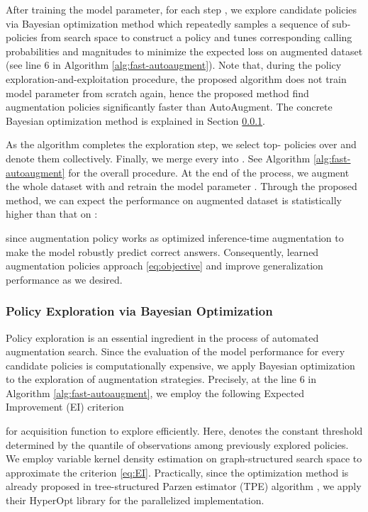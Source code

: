 \documentclass{article}
\newcommand{\cmtt}[1]{{\fontfamily{cmtt}\selectfont #1}}
\begin{document}
After training the model parameter, for each step , we explore  candidate policies  via Bayesian optimization method which repeatedly samples a sequence of sub-policies from search space  to construct a policy  and tunes corresponding calling probabilities  and magnitudes  to minimize the expected loss  on augmented dataset  (see line 6 in Algorithm \ref{alg:fast-autoaugment}). Note that, during the policy exploration-and-exploitation procedure, the proposed algorithm does not train model parameter from scratch again, hence the proposed method find augmentation policies significantly faster than AutoAugment. The concrete Bayesian optimization method is explained in Section \ref{subsubsec:optimization-density-estimation}. 


As the algorithm completes the exploration step, we select top- policies over  and denote them  collectively. Finally, we merge every  into . See Algorithm \ref{alg:fast-autoaugment} for the overall procedure. At the end of the process, we augment the whole dataset  with  and retrain the model parameter . Through the proposed method, we can expect the performance  on augmented dataset  is statistically higher than that on :

since augmentation policy  works as optimized inference-time augmentation \cite{simonyan2014very, szegedy2016rethinking} to make the model robustly predict correct answers. Consequently, learned augmentation policies approach \eqref{eq:objective} and improve generalization performance as we desired. 



\subsubsection{Policy Exploration via Bayesian Optimization}
\label{subsubsec:optimization-density-estimation}

Policy exploration is an essential ingredient in the process of automated augmentation search. Since the evaluation of the model performance for every candidate policies is computationally expensive, we apply Bayesian optimization to the exploration of augmentation strategies. Precisely, at the line 6 in Algorithm \ref{alg:fast-autoaugment}, we employ the following Expected Improvement (EI) criterion \cite{jones2001taxonomy}

for acquisition function to explore  efficiently. Here,  denotes the constant threshold determined by the quantile of observations among previously explored policies. We employ variable kernel density estimation \cite{terrell1992adaptive-kde}
on graph-structured search space  to approximate the criterion \eqref{eq:EI}. Practically, since the optimization method is already proposed in tree-structured Parzen estimator (TPE) algorithm \cite{bergstra2011algorithms}, we apply their \cmtt{HyperOpt} library for the parallelized implementation. 
\end{document}
